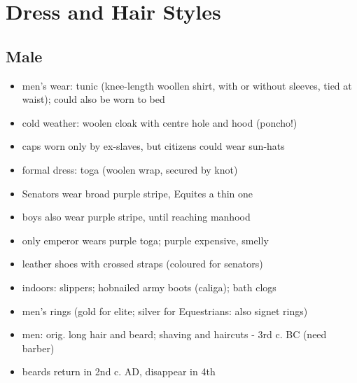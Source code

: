\documentclass[12pt, twoside]{article}
\begin{document}
\section{Dress and Hair Styles}
\subsection{Male}
\begin{itemize}
\item men's wear: tunic (knee-length woollen shirt, with or without sleeves, tied at waist); could also be worn to bed
\item cold weather: woolen cloak with centre hole and hood (poncho!)
\item caps worn only by ex-slaves, but citizens could wear sun-hats
\item formal dress: toga (woolen wrap, secured by knot)
\item Senators wear broad purple stripe, Equites a thin one
\item boys also wear purple stripe, until reaching manhood
\item only emperor wears purple toga; purple expensive, smelly
\item leather shoes with crossed straps (coloured for senators)
\item indoors: slippers; hobnailed army boots (caliga); bath clogs
\item men's rings (gold for elite;  silver for Equestrians: also signet rings)
\item men: orig. long hair and beard; shaving and haircuts - 3rd c. BC (need barber)
\item beards return in 2nd c. AD, disappear in 4th
\end{itemize}
\end{document}
